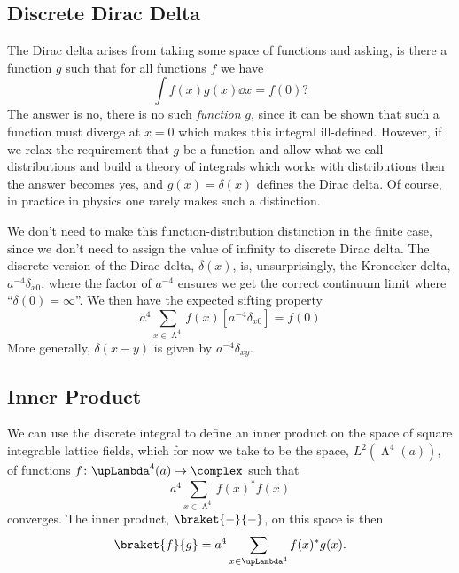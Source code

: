 \documentclass[fleqn]{NotesClass}
\newcommand{\lattice}[1][4]{\upLambda^{#1}}
\begin{document}
    \subsection{Discrete Dirac Delta}
    The Dirac delta arises from taking some space of functions and asking, is there a function \(g\) such that for all functions \(f\) we have
    \begin{equation}
        \int f(x)g(x) \dd{x} = f(0)?
    \end{equation}
    The answer is no, there is no such \emph{function} \(g\), since it can be shown that such a function must diverge at \(x = 0\) which makes this integral ill-defined.
    However, if we relax the requirement that \(g\) be a function and allow what we call distributions and build a theory of integrals which works with distributions then the answer becomes yes, and \(g(x) = \delta(x)\) defines the Dirac delta.
    Of course, in practice in physics one rarely makes such a distinction.
    
    We don't need to make this function-distribution distinction in the finite case, since we don't need to assign the value of infinity to discrete Dirac delta.
    The discrete version of the Dirac delta, \(\delta(x)\), is, unsurprisingly, the Kronecker delta, \(a^{-4}\delta_{x0}\), where the factor of \(a^{-4}\) ensures we get the correct continuum limit where \enquote{\(\delta(0) = \infty\)}.
    We then have the expected sifting property
    \begin{equation}
        a^4 \sum_{x \in \lattice} f(x) [a^{-4}\delta_{x0}] = f(0)
    \end{equation}
    More generally, \(\delta(x - y)\) is given by \(a^{-4}\delta_{xy}\).
    
    \subsection{Inner Product}
    We can use the discrete integral to define an inner product on the space of square integrable lattice fields, which for now we take to be the space, \(L^2(\lattice(a))\), of functions \(f \colon \lattice(a) \to \complex\) such that
    \begin{equation}
        a^4 \sum_{x \in \lattice} f(x)^* f(x)
    \end{equation}
    converges.
    The inner product, \(\braket{-}{-}\), on this space is then
    \begin{equation}
        \braket{f}{g} = a^4\sum_{x\in\lattice} f(x)^* g(x).
    \end{equation}
    
\end{document}
